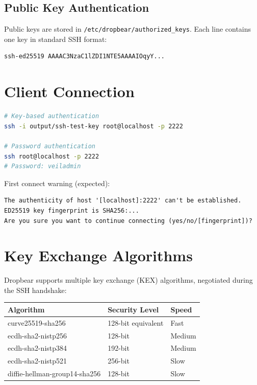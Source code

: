 \subsection{Public Key Authentication}

Public keys are stored in \texttt{/etc/dropbear/authorized\_keys}.
Each line contains one key in standard SSH format:

\begin{lstlisting}
ssh-ed25519 AAAAC3NzaC1lZDI1NTE5AAAAIOqyY...
\end{lstlisting}

\section{Client Connection}

\begin{lstlisting}[language=bash]
# Key-based authentication
ssh -i output/ssh-test-key root@localhost -p 2222

# Password authentication
ssh root@localhost -p 2222
# Password: veiladmin
\end{lstlisting}

First connect warning (expected):
\begin{lstlisting}
The authenticity of host '[localhost]:2222' can't be established.
ED25519 key fingerprint is SHA256:...
Are you sure you want to continue connecting (yes/no/[fingerprint])?
\end{lstlisting}


\section{Key Exchange Algorithms}

Dropbear supports multiple key exchange (KEX) algorithms, negotiated
during the SSH handshake:

\begin{longtable}{|p{4cm}|p{4cm}|p{4cm}|}
\hline
\textbf{Algorithm} & \textbf{Security Level} & \textbf{Speed} \\
\hline
curve25519-sha256 & 128-bit equivalent & Fast \\
ecdh-sha2-nistp256 & 128-bit & Medium \\
ecdh-sha2-nistp384 & 192-bit & Medium \\
ecdh-sha2-nistp521 & 256-bit & Slow \\
diffie-hellman-group14-sha256 & 128-bit & Slow \\
\hline
\end{longtable}

